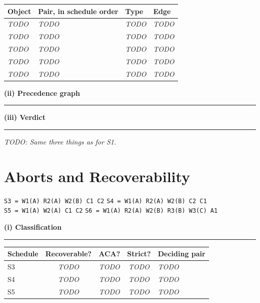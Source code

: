\documentclass[11pt, a4paper]{article}
\newcommand{\sched}[1]{\texttt{#1}}
\newcommand{\divider}{\par\noindent\rule{\linewidth}{0.3pt}\smallskip}
\begin{document}
\begin{center}
\begin{tabular}{@{}llll@{}}
\toprule
\textbf{Object} & \textbf{Pair, in schedule order} & \textbf{Type} & \textbf{Edge} \\
\midrule
\textit{TODO} & \textit{TODO} & \textit{TODO} & \textit{TODO} \\
\textit{TODO} & \textit{TODO} & \textit{TODO} & \textit{TODO} \\
\textit{TODO} & \textit{TODO} & \textit{TODO} & \textit{TODO} \\
\textit{TODO} & \textit{TODO} & \textit{TODO} & \textit{TODO} \\
\textit{TODO} & \textit{TODO} & \textit{TODO} & \textit{TODO} \\
\bottomrule
\end{tabular}
\end{center}

\bigskip
\textbf{(ii) Precedence graph}
\divider

\begin{center}
\end{center}

\bigskip
\textbf{(iii) Verdict}
\divider

\textit{TODO: Same three things as for S1.}

\section{Aborts and Recoverability}

\noindent
\sched{S3 = W1(A) R2(A) W2(B) C1 C2} \qquad
\sched{S4 = W1(A) R2(A) W2(B) C2 C1}\\[3pt]
\sched{S5 = W1(A) W2(A) C1 C2} \qquad
\sched{S6 = W1(A) R2(A) W2(B) R3(B) W3(C) A1}

\bigskip
\textbf{(i) Classification}
\divider

\begin{center}
\begin{tabularx}{\linewidth}{@{}lcccX@{}}
\toprule
\textbf{Schedule} & \textbf{Recoverable?} & \textbf{ACA?} & \textbf{Strict?} & \textbf{Deciding pair} \\
\midrule
S3 & \textit{TODO} & \textit{TODO} & \textit{TODO} & \textit{TODO} \\
\addlinespace
S4 & \textit{TODO} & \textit{TODO} & \textit{TODO} & \textit{TODO} \\
\addlinespace
S5 & \textit{TODO} & \textit{TODO} & \textit{TODO} & \textit{TODO} \\
\bottomrule
\end{tabularx}
\end{center}
\end{document}
